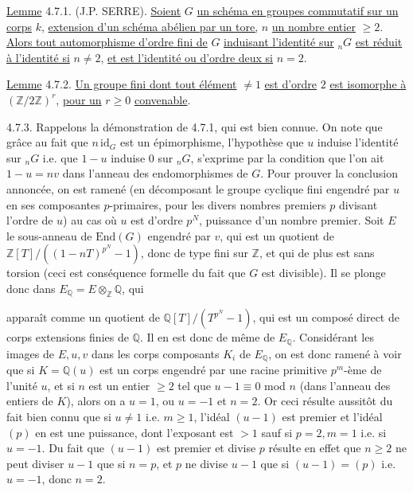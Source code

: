 \underline{Lemme} 4.7.1. (J.P. SERRE). \underline{Soient} $G$ \underline{un schéma en groupes commutatif sur un corps} $k$, \underline{extension d'un schéma abélien par un tore,} $n$ \underline{un nombre entier} $\geq 2$. \underline{Alors tout automorphisme d'ordre fini de} $G$ \underline{induisant l'identité sur} ${}_nG$ \underline{est réduit à l'identité si} $n \neq 2$, \underline{et est l'identité ou d'ordre deux si} $n = 2$.

\underline{Lemme} 4.7.2. \underline{Un groupe fini dont tout élément} $\neq 1$ \underline{est d'ordre} $2$ \underline{est isomorphe à} $(\mathbb{Z}/2\mathbb{Z})^r$, \underline{pour un} $r \geq 0$ \underline{convenable}.

4.7.3. Rappelons la démonstration de 4.7.1, qui est bien connue. On note que grâce au fait que $n\,\mathrm{id}_G$ est un épimorphisme, l'hypothèse que $u$ induise l'identité sur ${}_nG$ i.e. que $1 - u$ induise $0$ sur ${}_nG$, s'exprime par la condition que l'on ait $1 - u = nv$ dans l'anneau des endomorphismes de $G$. Pour prouver la conclusion annoncée, on est ramené (en décomposant le groupe cyclique fini engendré par $u$ en ses composantes $p$-primaires, pour les divers nombres premiers $p$ divisant l'ordre de $u$) au cas où $u$ est d'ordre $p^N$, puissance d'un nombre premier. Soit $E$ le sous-anneau de $\mathrm{End}(G)$ engendré par $v$, qui est un quotient de $\mathbb{Z}[T]/((1-nT)^{p^N}-1)$, donc de type fini sur $\mathbb{Z}$, et qui de plus est sans torsion (ceci est conséquence formelle du fait que $G$ est divisible). Il se plonge donc dans $E_{\mathbb{Q}} = E\otimes_{\mathbb{Z}} \mathbb{Q}$, qui



apparaît comme un quotient de $\mathbb{Q}[T]/(T^{p^N}-1)$, qui est un composé direct de corps extensions finies de $\mathbb{Q}$. Il en est donc de même de $E_{\mathbb{Q}}$. Considérant les images de $E,u,v$ dans les corps composants $K_i$ de $E_{\mathbb{Q}}$, on est donc ramené à voir que si $K = \mathbb{Q}(u)$ est un corps engendré par une racine primitive $p^m$-ème de l'unité $u$, et si $n$ est un entier $\geq 2$ tel que $u-1 \equiv 0$ mod $n$ (dans l'anneau des entiers de $K$), alors on a $u=1$, ou $u=-1$ et $n=2$. Or ceci résulte aussitôt du fait bien connu que si $u \neq 1$ i.e. $m \geq 1$, l'idéal $(u-1)$ est premier et l'idéal $(p)$ en est une puissance, dont l'exposant est $> 1$ sauf si $p=2,m=1$ i.e. si $u=-1$. Du fait que $(u-1)$ est premier et divise $p$ résulte en effet que $n \geq 2$ ne peut diviser $u-1$ que si $n=p$, et $p$ ne divise $u-1$ que si $(u-1) = (p)$ i.e. $u = -1$, donc $n = 2$.

